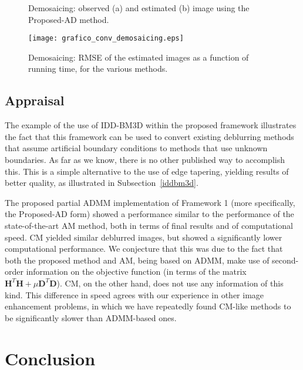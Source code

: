 \documentclass[10pt,twocolumn,twoside]{IEEEtran}
\newcommand{\Hm}{\mathbf{H}} %
\newcommand{\D}{\mathbf{D}} %
\begin{document}
\begin{figure}[!t]
	\centering
	\hfil
	\caption{Demosaicing: observed (a) and estimated (b) image using the Proposed-AD method.}
	\label{fig:parrot_demosaicing}
\end{figure}

\begin{figure}[!t]
	\centering
	\texttt{[image: grafico\_conv\_demosaicing.eps]}%
	\caption{Demosaicing: RMSE of the estimated images as a function of running time, for the various methods.}
	\label{fig:grafico_conv_demosaicing}
\end{figure}

\subsection{Appraisal}
\label{sec:appraisal}

The example of the use of IDD-BM3D within the proposed framework illustrates the fact that this framework can be used to convert existing deblurring methods that assume artificial boundary conditions to methods that use unknown boundaries. As far as we know, there is no other published way to accomplish this. This is a simple alternative to the use of edge tapering, yielding results of better quality, as illustrated in Subsection~\ref{iddbm3d}.

The proposed partial ADMM implementation of Framework 1 (more specifically, the Proposed-AD form) showed a performance similar to the performance of the state-of-the-art AM method, both in terms of final results and of computational speed. CM yielded similar deblurred images, but showed a significantly lower computational performance. We conjecture that this was due to the fact that both the proposed method and AM, being based on ADMM, make use of second-order information on the objective function (in terms of the matrix $\Hm^T \Hm + \mu \D^T \D$). CM, on the other hand, does not use any information of this kind. This difference in speed agrees with our experience in other image enhancement problems, in which we have repeatedly found CM-like methods to be significantly slower than ADMM-based ones.

\section{Conclusion} \label{sec:conclusion}
\end{document}
